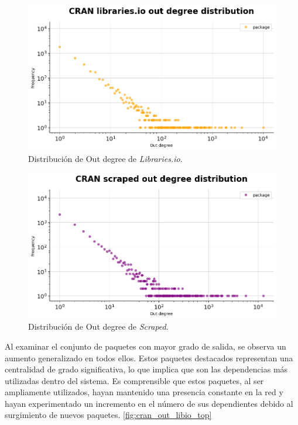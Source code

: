 \begin{figure}[ht!]
    \begin{center}
        \includegraphics[width=1\textwidth]{img/cran/out_deg.png}
        \caption{Distribución de Out degree de \textit{Libraries.io}.}
        \label{fig:cran_out_lib}
    \end{center}
\end{figure}

\begin{figure}[ht!]
    \begin{center}
        \includegraphics[width=1\textwidth]{img/cran/out_deg2.png}
        \caption{Distribución de Out degree de \textit{Scraped}.}
        \label{fig:cran_out_scraped}
    \end{center}
\end{figure}

Al examinar el conjunto de paquetes con mayor grado de salida, se observa un aumento generalizado
en todos ellos. Estos paquetes destacados representan una centralidad de grado significativa,
lo que implica que son las dependencias más utilizadas dentro del sistema. Es comprensible que
estos paquetes, al ser ampliamente utilizados, hayan mantenido una presencia constante en la
red y hayan experimentado un incremento en el número de sus dependientes debido al surgimiento
de nuevos paquetes. \ref{fig:cran_out_libio_top}

